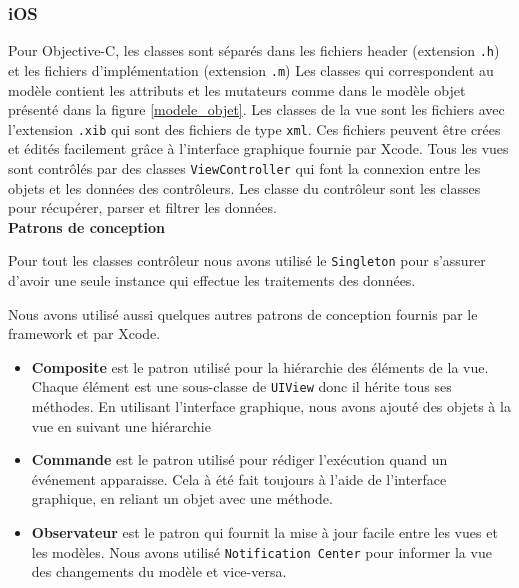\documentclass[a4paper, 11px]{article}
\begin{document}
\subsubsection{iOS}
Pour Objective-C, les classes sont séparés dans les fichiers header (extension \texttt{.h}) et les fichiers d'implémentation (extension \texttt{.m})
Les classes qui correspondent au modèle contient les attributs et les mutateurs comme dans le modèle objet présenté dans la figure \ref{modele_objet}. Les classes de la vue sont les fichiers avec l'extension \texttt{.xib} qui sont des fichiers de type \texttt{xml}. Ces fichiers peuvent être crées et édités facilement grâce à l'interface graphique fournie par Xcode. Tous les vues sont contrôlés par des classes \texttt{ViewController} qui font la connexion entre les objets et les données des contrôleurs.
Les classe du contrôleur sont les classes pour récupérer, parser et filtrer les données.\\

{\bf Patrons de conception}

Pour tout les classes contrôleur nous avons utilisé le \texttt{Singleton} pour s'assurer d'avoir une seule instance qui effectue les traitements des données.

Nous avons utilisé aussi quelques autres patrons de conception fournis par le framework et par Xcode. \\
\begin{itemize}
	\item {\bf Composite} est le patron utilisé pour la hiérarchie des éléments de la vue. Chaque élément est une sous-classe de \texttt{UIView} donc il hérite tous ses méthodes.
En utilisant l'interface graphique, nous avons ajouté des objets à la vue en suivant une hiérarchie\\
	\item {\bf Commande} est le patron utilisé pour rédiger l'exécution quand un événement apparaisse. Cela à été fait toujours à l'aide de l'interface graphique, en reliant un objet avec une méthode.\\
	\item {\bf Observateur} est le patron qui fournit la mise à jour facile entre les vues et les modèles. Nous avons utilisé \texttt{Notification Center} pour informer la vue des changements du modèle et vice-versa.
\end{itemize}
\end{document}
